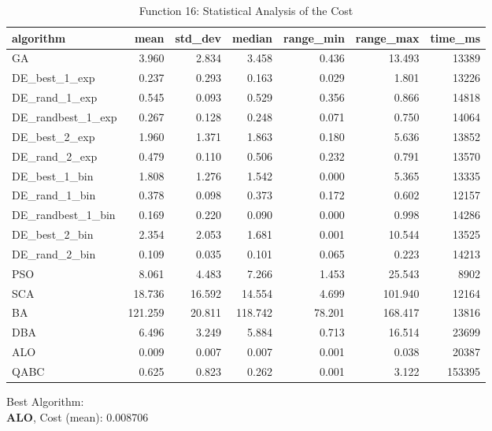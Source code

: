 \documentclass[12pt]{article}
\begin{document}
\begin{table}[H]
    \centering
    \footnotesize
    \begin{adjustbox}{width=1\textwidth}
\begin{tabular}{lrrrrrr}
\toprule
         algorithm &    mean &  std\_dev &  median &  range\_min &  range\_max &  time\_ms \\
\midrule
                GA &   3.960 &    2.834 &   3.458 &      0.436 &     13.493 &    13389 \\
     DE\_best\_1\_exp &   0.237 &    0.293 &   0.163 &      0.029 &      1.801 &    13226 \\
     DE\_rand\_1\_exp &   0.545 &    0.093 &   0.529 &      0.356 &      0.866 &    14818 \\
 DE\_randbest\_1\_exp &   0.267 &    0.128 &   0.248 &      0.071 &      0.750 &    14064 \\
     DE\_best\_2\_exp &   1.960 &    1.371 &   1.863 &      0.180 &      5.636 &    13852 \\
     DE\_rand\_2\_exp &   0.479 &    0.110 &   0.506 &      0.232 &      0.791 &    13570 \\
     DE\_best\_1\_bin &   1.808 &    1.276 &   1.542 &      0.000 &      5.365 &    13335 \\
     DE\_rand\_1\_bin &   0.378 &    0.098 &   0.373 &      0.172 &      0.602 &    12157 \\
 DE\_randbest\_1\_bin &   0.169 &    0.220 &   0.090 &      0.000 &      0.998 &    14286 \\
     DE\_best\_2\_bin &   2.354 &    2.053 &   1.681 &      0.001 &     10.544 &    13525 \\
     DE\_rand\_2\_bin &   0.109 &    0.035 &   0.101 &      0.065 &      0.223 &    14213 \\
               PSO &   8.061 &    4.483 &   7.266 &      1.453 &     25.543 &     8902 \\
               SCA &  18.736 &   16.592 &  14.554 &      4.699 &    101.940 &    12164 \\
                BA & 121.259 &   20.811 & 118.742 &     78.201 &    168.417 &    13816 \\
               DBA &   6.496 &    3.249 &   5.884 &      0.713 &     16.514 &    23699 \\
               ALO &   0.009 &    0.007 &   0.007 &      0.001 &      0.038 &    20387 \\
              QABC &   0.625 &    0.823 &   0.262 &      0.001 &      3.122 &   153395 \\
\bottomrule
\end{tabular}


    \end{adjustbox}
    \caption{Function 16: Statistical Analysis of the Cost} 
    \end{table}
Best Algorithm: \\
\textbf{ALO}, Cost (mean): 0.008706\\
\newpage
\end{document}

